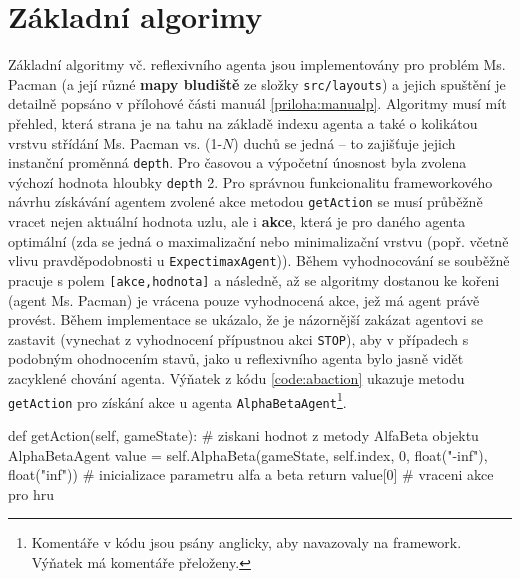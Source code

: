 \section{Základní algorimy}
Základní algoritmy vč. reflexivního agenta jsou implementovány pro problém Ms. Pacman (a její různé \textbf{mapy bludiště} ze složky \texttt{src/layouts}) a jejich spuštění je detailně popsáno v přílohové části manuál \ref{priloha:manualp}. Algoritmy musí mít přehled, která strana je na tahu na základě indexu agenta a také o kolikátou vrstvu střídání Ms. Pacman vs. (1-$N$) duchů se jedná -- to zajišťuje jejich instanční proměnná \texttt{depth}. Pro časovou a výpočetní únosnost byla zvolena výchozí hodnota hloubky \texttt{depth} 2. Pro správnou funkcionalitu frameworkového návrhu získávání agentem zvolené akce metodou \texttt{getAction} se musí průběžně vracet nejen aktuální hodnota uzlu, ale i \textbf{akce}, která je pro daného agenta optimální (zda se jedná o maximalizační nebo minimalizační vrstvu (popř. včetně vlivu pravděpodobnosti u \texttt{ExpectimaxAgent})). Během vyhodnocování se souběžně pracuje s polem \texttt{[akce,hodnota]} a následně, až se algoritmy dostanou ke kořeni (agent Ms. Pacman) je vrácena pouze vyhodnocená akce, jež má agent právě provést.
Během implementace se ukázalo, že je názornější zakázat agentovi se zastavit (vynechat z vyhodnocení přípustnou akci \texttt{STOP}), aby v případech s podobným ohodnocením stavů, jako u reflexivního agenta bylo jasně vidět zacyklené chování agenta.
Výňatek z kódu \ref{code:abaction} ukazuje metodu \texttt{getAction} pro získání akce u agenta \texttt{AlphaBetaAgent}\footnote{Komentáře v kódu jsou psány anglicky, aby navazovaly na framework. Výňatek má komentáře přeloženy.}.

\begin{python}[label={code:abaction}]
def getAction(self, gameState):
   # ziskani hodnot z metody AlfaBeta objektu AlphaBetaAgent
   value = self.AlphaBeta(gameState, self.index, 0,
   float("-inf"), float("inf")) # inicializace parametru alfa a beta
   return value[0] # vraceni akce pro hru
\end{python}

